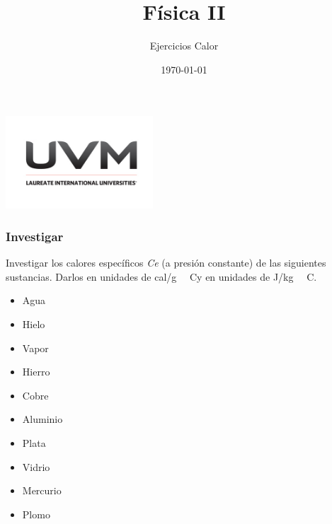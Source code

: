 \documentclass[handout]{beamer}
\title{Física II}
\author{Ejercicios Calor}
\institute[UVM]{4\textdegree \hspace{2pt} cuatrimestre.}
\date{\today}
\newcommand{\celsius}{~\textdegree~C}
\begin{document}
\begin{frame}[noframenumbering]
  \titlepage
  \begin{center}
    \includegraphics[width=5.5cm]{uvm1}    
  \end{center}  
\end{frame}


\begin{frame}[allowframebreaks,t]
  \frametitle{Investigar}
  \begin{block}{ }
    Investigar los calores específicos \textit{Ce} (a presión constante) de las siguientes
    sustancias. Darlos en unidades de cal/g \celsius y en unidades de J/kg \celsius. 
    \begin{itemize}
    \item Agua
    \item Hielo
    \item Vapor
    \item Hierro
    \item Cobre
    \item Aluminio
    \item Plata
    \item Vidrio
    \item Mercurio
    \item Plomo
    \end{itemize}
    \end{block}

\end{frame}
\end{document}
